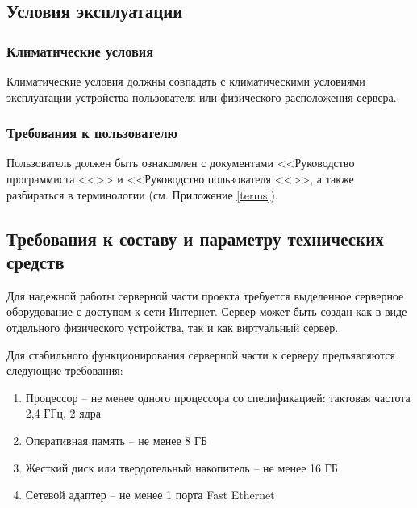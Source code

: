 \documentclass[a4paper,12pt,reqno]{article}
\begin{document}
    \subsection{Условия эксплуатации}

    \subsubsection{Климатические условия}
    Климатические условия должны совпадать с климатическими условиями эксплуатации устройства пользователя или физического расположения сервера.

    \subsubsection{Требования к пользователю}
    Пользователь должен быть ознакомлен с документами <<Руководство программиста  <<\unskip>> и <<Руководство пользователя <<\unskip>>, а также разбираться в терминологии (см. Приложение \ref{terms}).

    \subsection{Требования к составу и параметру технических средств}
    Для надежной работы серверной части проекта требуется выделенное серверное оборудование с доступом к сети Интернет. Сервер может быть создан как в виде отдельного физического устройства, так и как виртуальный сервер.

    Для стабильного функционирования серверной части к серверу предъявляются следующие требования:
    \begin{enumerate}
        \item Процессор – не менее одного процессора со спецификацией: тактовая частота 2,4 ГГц, 2 ядра
        \item Оперативная память – не менее 8 ГБ
        \item Жесткий диск или твердотельный накопитель – не менее 16 ГБ
        \item Сетевой адаптер – не менее 1 порта Fast Ethernet
    \end{enumerate}
\end{document}

